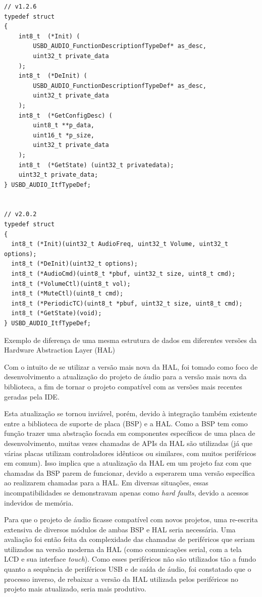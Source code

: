 \begin{sourcecode}[!ht]
\centering
\begin{verbatim}
// v1.2.6
typedef struct
{
    int8_t  (*Init) (
        USBD_AUDIO_FunctionDescriptionfTypeDef* as_desc, 
        uint32_t private_data
    );
    int8_t  (*DeInit) (
        USBD_AUDIO_FunctionDescriptionfTypeDef* as_desc,
        uint32_t private_data
    );
    int8_t  (*GetConfigDesc) (
        uint8_t **p_data, 
        uint16_t *p_size, 
        uint32_t private_data
    );
    int8_t  (*GetState) (uint32_t privatedata);
    uint32_t private_data;  
} USBD_AUDIO_ItfTypeDef;


// v2.0.2
typedef struct
{
  int8_t (*Init)(uint32_t AudioFreq, uint32_t Volume, uint32_t options);
  int8_t (*DeInit)(uint32_t options);
  int8_t (*AudioCmd)(uint8_t *pbuf, uint32_t size, uint8_t cmd);
  int8_t (*VolumeCtl)(uint8_t vol);
  int8_t (*MuteCtl)(uint8_t cmd);
  int8_t (*PeriodicTC)(uint8_t *pbuf, uint32_t size, uint8_t cmd);
  int8_t (*GetState)(void);
} USBD_AUDIO_ItfTypeDef;

\end{verbatim}
\caption{Exemplo de diferença de uma mesma estrutura de dados em diferentes versões da Hardware Abstraction Layer (HAL)}
\label{code:hal-differences}
\end{sourcecode}

Com o intuito de se utilizar a versão mais nova da HAL, foi tomado como foco de desenvolvimento a atualização do projeto de áudio para a versão mais nova da biblioteca, a fim de tornar o projeto compatível com as versões mais recentes geradas pela IDE.

Esta atualização se tornou inviável, porém, devido à integração também existente entre a biblioteca de suporte de placa (BSP) e a HAL. Como a BSP tem como função trazer uma abstração focada em componentes específicos de uma placa de desenvolvimento, muitas vezes chamadas de APIs da HAL são utilizadas (já que várias placas utilizam controladores idênticos ou similares, com muitos periféricos em comum). Isso implica que a atualização da HAL em um projeto faz com que chamadas da BSP parem de funcionar, devido a esperarem uma versão específica ao realizarem chamadas para a HAL. Em diversas situações, essas incompatibilidades se demonstravam apenas como \textit{hard faults}, devido a acessos indevidos de memória.

Para que o projeto de áudio ficasse compatível com novos projetos, uma re-escrita extensiva de diversos módulos de ambas BSP e HAL seria necessária. Uma avaliação foi então feita da complexidade das chamadas de periféricos que seriam utilizados na versão moderna da HAL (como comunicações serial, com a tela LCD e sua interface \textit{touch}). Como esses periféricos não são utilizados tão a fundo quanto a sequência de periféricos USB e de saída de áudio, foi constatado que o processo inverso, de rebaixar a versão da HAL utilizada pelos periféricos no projeto mais atualizado, seria mais produtivo.

